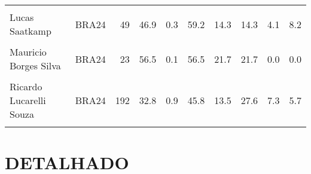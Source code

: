 \documentclass[
]{book}
\begin{document}
\begin{table}[!h]
{\begin{tabular}[t]{llrrrrrrrr}
\addlinespace
\cellcolor{gray!10}{Judson Amabel Nunes Da Cunha Jr} & \cellcolor{gray!10}{BRA24} & \cellcolor{gray!10}{5} & \cellcolor{gray!10}{40.0} & \cellcolor{gray!10}{0.0} & \cellcolor{gray!10}{60.0} & \cellcolor{gray!10}{0.0} & \cellcolor{gray!10}{20.0} & \cellcolor{gray!10}{0.0} & \cellcolor{gray!10}{20.0}\\
Lucas Saatkamp & BRA24 & 49 & 46.9 & 0.3 & 59.2 & 14.3 & 14.3 & 4.1 & 8.2\\
\cellcolor{gray!10}{Lukas Felipe Bergmann} & \cellcolor{gray!10}{BRA24} & \cellcolor{gray!10}{37} & \cellcolor{gray!10}{54.1} & \cellcolor{gray!10}{0.2} & \cellcolor{gray!10}{56.8} & \cellcolor{gray!10}{16.2} & \cellcolor{gray!10}{24.3} & \cellcolor{gray!10}{0.0} & \cellcolor{gray!10}{2.7}\\
Mauricio Borges Silva & BRA24 & 23 & 56.5 & 0.1 & 56.5 & 21.7 & 21.7 & 0.0 & 0.0\\
\cellcolor{gray!10}{Otavio Henrique Rodrigues Pinto} & \cellcolor{gray!10}{BRA24} & \cellcolor{gray!10}{5} & \cellcolor{gray!10}{20.0} & \cellcolor{gray!10}{0.0} & \cellcolor{gray!10}{40.0} & \cellcolor{gray!10}{20.0} & \cellcolor{gray!10}{20.0} & \cellcolor{gray!10}{0.0} & \cellcolor{gray!10}{20.0}\\
\addlinespace
Ricardo Lucarelli Souza & BRA24 & 192 & 32.8 & 0.9 & 45.8 & 13.5 & 27.6 & 7.3 & 5.7\\
\cellcolor{gray!10}{Yoandy Leal Hidalgo} & \cellcolor{gray!10}{BRA24} & \cellcolor{gray!10}{150} & \cellcolor{gray!10}{32.0} & \cellcolor{gray!10}{0.7} & \cellcolor{gray!10}{44.7} & \cellcolor{gray!10}{14.0} & \cellcolor{gray!10}{28.7} & \cellcolor{gray!10}{7.3} & \cellcolor{gray!10}{5.3}\\
\bottomrule
\end{tabular}}
\end{table}

\section{DETALHADO}\label{detalhado-1}
\end{document}
